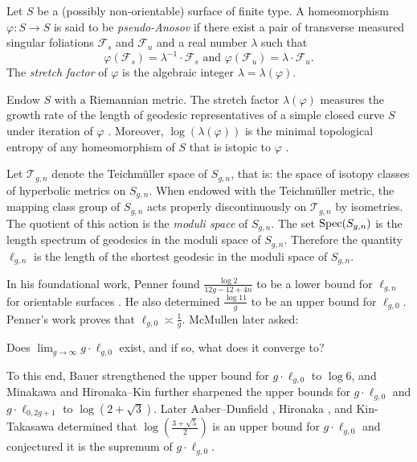  Let $S$ be a (possibly non-orientable) surface of finite type.  A homeomorphism $\varphi:S\rightarrow S$ is said to be {\it pseudo-Anosov} if there exist a pair of transverse measured singular foliations $\mathcal{F}_s$ and $\mathcal{F}_u$ and a real number $\lambda$ such that $$\varphi(\mathcal{F}_s)=\lambda^{-1} \cdot \mathcal{F}_s\text{ and } \varphi(\mathcal{F}_u)=\lambda \cdot \mathcal{F}_u.$$  The {\it stretch factor} of $\varphi$ is the algebraic integer $\lambda=\lambda(\varphi)$.


Endow $S$ with a Riemannian metric.  The stretch factor $\lambda(\varphi)$ measures the growth rate of the length of geodesic representatives of a simple closed curve $S$ under iteration of $\varphi$ \cite[Proposition 9.21]{FLP}.  Moreover, $\log(\lambda(\varphi))$ is the minimal topological entropy of any homeomorphism of $S$ that is istopic to $\varphi$ \cite[Expos\'e 10]{FLP}.


Let $\mathcal{T}_{g,n}$ denote the Teichm\"uller space of $S_{g,n}$, that is: the space of isotopy classes of hyperbolic metrics on $S_{g,n}$.
When endowed with the Teichm\"uller metric, the mapping class group of $S_{g,n}$ acts properly discontinuously on $\mathcal{T}_{g,n}$ by isometries.  The quotient of this action is the {\it moduli space} of $S_{g,n}$. The set
$\operatorname{Spec}(S_{g,n})$ is the length spectrum of geodesics in the moduli space of $S_{g,n}$.  Therefore the quantity $\ell_{g,n}$ is the length of the shortest geodesic in the moduli space of $S_{g,n}$.

 In his foundational work, Penner found $\frac{\log 2}{12g-12+4n}$ to be a lower bound for $\ell_{g,n}$ for orientable surfaces \cite{penner1991bounds}.  He also determined $\frac{\log 11}{g}$ to be an upper bound for $\ell_{g,0}$.  Penner's work proves that $\ell_{g,0}\asymp \frac{1}{g}$.  McMullen  \cite{mcmullen2000polynomial} later asked:
\begin{question}[McMullen]
Does $\displaystyle\lim_{g\rightarrow\infty}g\cdot \ell_{g,0}$ exist, and if so, what does it converge to?
\end{question}
To this end, Bauer \cite{bauer} strengthened the upper bound for $g\cdot \ell_{g,0}$ to $\log 6$, and Minakawa \cite{minakawa} and Hironaka--Kin \cite{HK} further sharpened the upper bounds for $g\cdot \ell_{g,0}$ and $g\cdot \ell_{0,2g+1}$ to $\log(2+\sqrt{3})$.  Later Aaber--Dunfield \cite{AD}, Hironaka \cite{hironaka}, and Kin-Takasawa \cite{KTbounds} determined that $\log\left(\frac{3+\sqrt{5}}{2}\right)$ is an upper bound for $g\cdot \ell_{g,0}$ and conjectured it is the supremum of $g\cdot \ell_{g,0}$.

